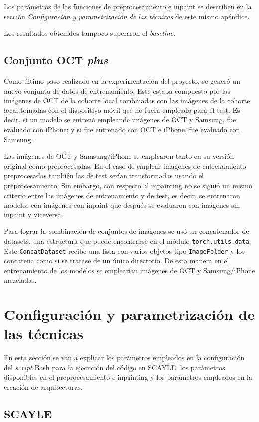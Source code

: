 Los parámetros de las funciones de preprocesamiento e inpaint se describen en la sección \textit{Configuración y parametrización de las técnicas} de este mismo apéndice.

Los resultados obtenidos tampoco superaron el \textit{baseline}.

\subsection{Conjunto OCT \textit{plus}}

Como último paso realizado en la experimentación del proyecto, se generó un nuevo conjunto de datos de entrenamiento. Este estaba compuesto por las imágenes de OCT de la cohorte local combinadas con las imágenes de la cohorte local tomadas con el dispositivo móvil que no fuera empleado para el test. Es decir, si un modelo se entrenó empleando imágenes de OCT y Samsung, fue evaluado con iPhone; y si fue entrenado con OCT e iPhone, fue evaluado con Samsung.

Las imágenes de OCT y Samsung/iPhone se emplearon tanto en su versión original como preprocesadas. En el caso de emplear imágenes de entrenamiento preprocesadas también las de test serían transformadas usando el preprocesamiento. Sin embargo, con respecto al inpainting no se siguió un mismo criterio entre las imágenes de entrenamiento y de test, es decir, se entrenaron modelos con imágenes con inpaint que después se evaluaron con imágenes sin inpaint y viceversa.

Para lograr la combinación de conjuntos de imágenes se usó un concatenador de datasets, una estructura que puede encontrarse en el módulo \texttt{torch.utils.data}. Este \texttt{ConcatDataset} recibe una lista con varios objetos tipo \texttt{ImageFolder} y los concatena como si se tratase de un único directorio. De esta manera en el entrenamiento de los modelos se emplearían imágenes de OCT y Samsung/iPhone mezcladas.

\section{Configuración y parametrización de las técnicas}

En esta sección se van a explicar los parámetros empleados en la configuración del \textit{script} Bash para la ejecución del código en SCAYLE, los parámetros disponibles en el preprocesamiento e inpainting y los parámetros empleados en la creación de arquitecturas.

\subsection{SCAYLE}


